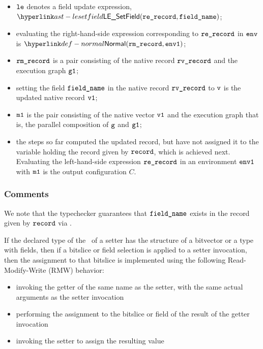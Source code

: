 \ProseParagraph
\AllApply
\begin{itemize}
  \item $\vle$ denotes a field update expression, $\LESetField(\rerecord, \fieldname)$;
  \item evaluating the right-hand-side expression corresponding to $\rerecord$
  in $\env$ is $\Normal(\rmrecord, \envone)$\ProseOrAbnormal;
  \item $\rmrecord$ is a pair consisting of the native record $\rvrecord$ and
  the execution graph $\vgone$;
  \item setting the field $\fieldname$ in the native record $\rvrecord$ to $\vv$
  is the updated native record $\vvone$;
  \item $\vmone$ is the pair consisting of the native vector $\vvone$ and the
  execution graph that is, the parallel composition of $\vg$ and $\vgone$;
  \item the steps so far computed the updated record, but have not assigned it to
  the variable holding the record given by $\record$, which is achieved next.
  Evaluating the left-hand-side expression $\rerecord$ in an environment $\envone$ with $\vmone$
  is the output configuration $C$.
\end{itemize}

\FormallyParagraph
\begin{mathpar}
\end{mathpar}

\subsubsection{Comments}
We note that the typechecker guarantees that $\fieldname$ exists in the record given by $\record$
via .

If the declared type of the \rhsexpression\ of a setter has the structure of a
bitvector or a type with fields, then if a bitslice or field selection is
applied to a setter invocation, then the assignment to that bitslice is
implemented using the following Read-Modify-Write (RMW) behavior:
\begin{itemize}
    \item invoking the getter of the same name as the setter, with the same actual
    arguments as the setter invocation
    \item performing the assignment to the bitslice or field of the result of the
    getter invocation
    \item invoking the setter to assign the resulting value
\end{itemize}
